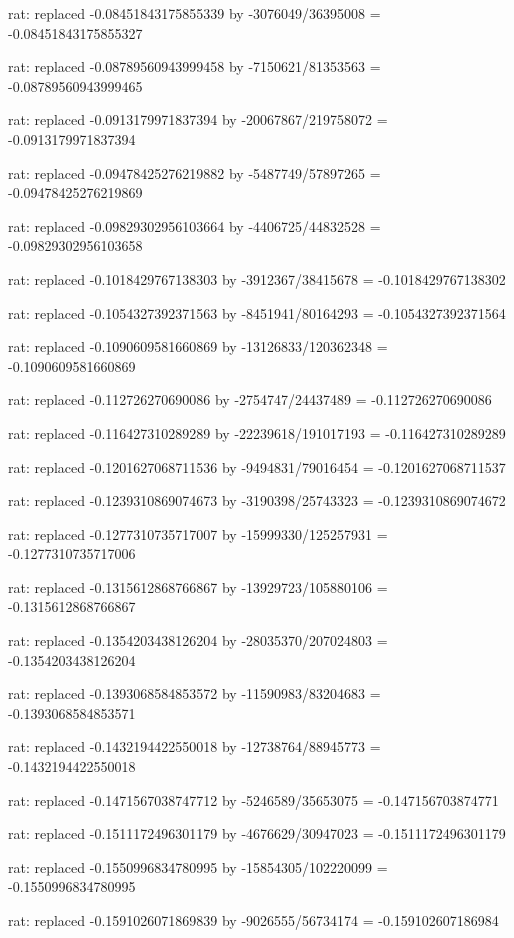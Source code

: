 \documentclass[a4paper,10pt]{article}
\begin{document}
\begin{eulernotebook}
\begin{eulercomment}
\begin{eulercomment}
\begin{eulercomment}
\begin{eulercomment}
\begin{eulercomment}
\begin{eulercomment}
\begin{eulercomment}
\begin{eulercomment}
\begin{eulercomment}
\begin{eulercomment}
\begin{eulercomment}
\begin{eulercomment}
\begin{eulercomment}
\begin{eulercomment}
\begin{eulercomment}
\begin{eulercomment}
\begin{euleroutput}
  rat: replaced -0.08451843175855339 by -3076049/36395008 = -0.08451843175855327
  
  rat: replaced -0.08789560943999458 by -7150621/81353563 = -0.08789560943999465
  
  rat: replaced -0.0913179971837394 by -20067867/219758072 = -0.0913179971837394
  
  rat: replaced -0.09478425276219882 by -5487749/57897265 = -0.09478425276219869
  
  rat: replaced -0.09829302956103664 by -4406725/44832528 = -0.09829302956103658
  
  rat: replaced -0.1018429767138303 by -3912367/38415678 = -0.1018429767138302
  
  rat: replaced -0.1054327392371563 by -8451941/80164293 = -0.1054327392371564
  
  rat: replaced -0.1090609581660869 by -13126833/120362348 = -0.1090609581660869
  
  rat: replaced -0.112726270690086 by -2754747/24437489 = -0.112726270690086
  
  rat: replaced -0.116427310289289 by -22239618/191017193 = -0.116427310289289
  
  rat: replaced -0.1201627068711536 by -9494831/79016454 = -0.1201627068711537
  
  rat: replaced -0.1239310869074673 by -3190398/25743323 = -0.1239310869074672
  
  rat: replaced -0.1277310735717007 by -15999330/125257931 = -0.1277310735717006
  
  rat: replaced -0.1315612868766867 by -13929723/105880106 = -0.1315612868766867
  
  rat: replaced -0.1354203438126204 by -28035370/207024803 = -0.1354203438126204
  
  rat: replaced -0.1393068584853572 by -11590983/83204683 = -0.1393068584853571
  
  rat: replaced -0.1432194422550018 by -12738764/88945773 = -0.1432194422550018
  
  rat: replaced -0.1471567038747712 by -5246589/35653075 = -0.147156703874771
  
  rat: replaced -0.1511172496301179 by -4676629/30947023 = -0.1511172496301179
  
  rat: replaced -0.1550996834780995 by -15854305/102220099 = -0.1550996834780995
  
  rat: replaced -0.1591026071869839 by -9026555/56734174 = -0.159102607186984
  

\end{euleroutput}
\end{eulercomment}
\end{eulercomment}
\end{eulercomment}
\end{eulercomment}
\end{eulercomment}
\end{eulercomment}
\end{eulercomment}
\end{eulercomment}
\end{eulercomment}
\end{eulercomment}
\end{eulercomment}
\end{eulercomment}
\end{eulercomment}
\end{eulercomment}
\end{eulercomment}
\end{eulercomment}
\end{eulernotebook}
\end{document}
